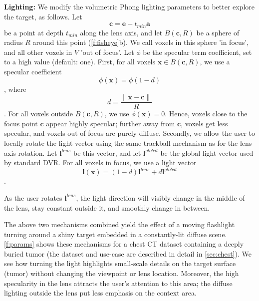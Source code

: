 \par  \textbf{Lighting:} We modify the volumetric Phong lighting parameters to better explore the target, as follows. Let
\begin{equation}
\mathbf{c} = \mathbf{e} + t_{min}\mathbf{a}
\end{equation} 
 be a point at depth $t_{min}$ along the lens axis, and let $B(\mathbf{c},R)$ be a sphere of radius $R$ around this point (\autoref{f:fisheye}b). We call voxels in this sphere 'in focus', and all other voxels in $V$ 'out of focus'. Let $\phi$ be the specular term coefficient, set to a high value (default: one).
First, for all voxels $\mathbf{x} \in B(\mathbf{c},R)$, we use a specular coefficient 
\begin{equation}
\phi(\mathbf{x}) = \phi (1-d)
\end{equation}
, where 
\begin{equation}
 d= \frac{\|\mathbf{x}-\mathbf{c}\|}{R}
\end{equation}. 
For all voxels outside $B(\mathbf{c},R)$, we use $\phi(\mathbf{x}) = 0$. Hence, voxels close to the focus point $\mathbf{c}$ appear highly specular; further away from $\mathbf{c}$, voxels get less specular, and voxels out of focus are purely diffuse. Secondly, we allow the user to locally rotate the light vector using the same trackball mechanism as for the lens axis rotation. Let $\mathbf{l}^{lens}$ be this vector, and let $\mathbf{l}^{global}$ be the global light vector used by standard DVR. For all voxels in focus, we use a light vector
\begin{equation}
\mathbf{l}(\mathbf{x}) = (1 - d)\mathbf{l}^{lens} + d\mathbf{l}^{global}
\end{equation}.
 
  As the user rotates $\mathbf{l}^{lens}$, the light direction will visibly change in the middle of the lens, stay constant outside it, and smoothly change in between.


\par  The above two mechanisms combined yield the effect of a moving flashlight turning around a shiny target embedded in a constantly-lit diffuse scene. \autoref{f:params} shows these mechanisms for a chest CT dataset containing a deeply buried tumor (the dataset and use-case are described in detail in \autoref{sec:chest}). We see how turning the light highlights small-scale details on the target surface (tumor) without changing the viewpoint or lens location. Moreover, the high specularity in the lens attracts the user's attention to this area; the diffuse lighting outside the lens put less emphasis on the context area. 


